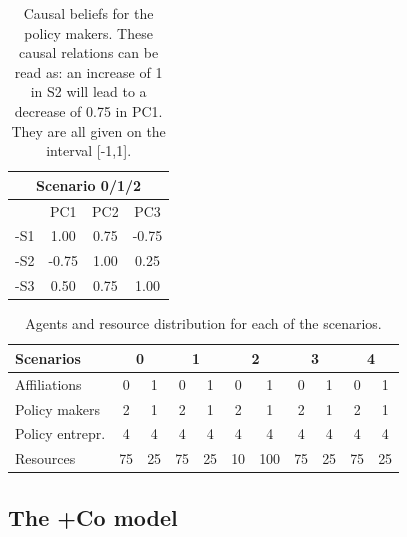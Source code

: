 \documentclass[12pt]{article}
\begin{document}
\begin{table}[h!]
\begin{center}
\begin{tabular}{ |c|c|c|c|}
\hline
\multicolumn{4}{|c|}{ {\bfseries Scenario 0/1/2}}	
								\\ \hline \hline
	& PC1	& PC2	& PC3		\\ \hline
-S1 	& 1.00	& 0.75	&-0.75		\\ \hline
-S2 	&-0.75	& 1.00	& 0.25 		\\ \hline
-S3 	& 0.50	& 0.75	& 1.00		\\ 
\hline
\end{tabular}
\end{center}
\caption{Causal beliefs for the policy makers. These causal relations can be read as: an increase of 1 in S2 will lead to a decrease of 0.75 in PC1. They are all given on the interval [-1,1].}
\label{tab:causalBeliefs}
\end{table}

\begin{table}[h!]
\begin{center}
\begin{tabular}{ |l||c|c||c|c||c|c||c|c||c|c| } 
\hline
 {\bfseries Scenarios}
 				& \multicolumn{2}{|c||}{ {\bfseries 0}}	
						& \multicolumn{2}{|c||}{ {\bfseries 1}}	
								& \multicolumn{2}{|c||}{ {\bfseries 2}}	
										& \multicolumn{2}{|c||}{ {\bfseries 3}}	
												& \multicolumn{2}{|c|}{ {\bfseries 4}}	
														\\ \hline \hline
Affiliations			& 0	& 1	& 0	& 1	& 0	& 1	& 0	& 1	& 0	& 1	\\ \hline
Policy makers 		& 2	& 1	& 2	& 1	& 2	& 1	& 2	& 1	& 2	& 1	\\ \hline
Policy entrepr.		& 4	& 4	& 4	& 4	& 4	& 4	& 4	& 4	& 4	& 4	\\ \hline
Resources		& 75	& 25	& 75	& 25	& 10	&100	& 75	& 25	& 75	& 25	\\ \hline
\end{tabular}
\end{center}
\caption{Agents and resource distribution for each of the scenarios.}
\label{tab:agentResourceDistribution}
\end{table}

\subsection{The +Co model}
\end{document}
